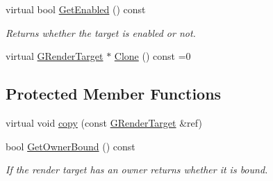 \begin{DoxyCompactItemize}
virtual bool \mbox{\hyperlink{class_geometry_engine_1_1_geometry_buffer_1_1_g_render_target_a6134efcdfa6fa9775c293a0802706cfc}{Get\+Enabled}} () const
\begin{DoxyCompactList}\small\item\em Returns whether the target is enabled or not. \end{DoxyCompactList}\item 
virtual \mbox{\hyperlink{class_geometry_engine_1_1_geometry_buffer_1_1_g_render_target}{G\+Render\+Target}} $\ast$ \mbox{\hyperlink{class_geometry_engine_1_1_geometry_buffer_1_1_g_render_target_a3b14d8929cf9d2acb6bc263c709ff019}{Clone}} () const =0
\end{DoxyCompactItemize}
\subsection*{Protected Member Functions}
\begin{DoxyCompactItemize}
\item 
virtual void \mbox{\hyperlink{class_geometry_engine_1_1_geometry_buffer_1_1_g_render_target_a84368b4a4cac9f916d36c3117e6b1224}{copy}} (const \mbox{\hyperlink{class_geometry_engine_1_1_geometry_buffer_1_1_g_render_target}{G\+Render\+Target}} \&ref)
\item 
\mbox{\label{class_geometry_engine_1_1_geometry_buffer_1_1_g_render_target_a41e7e08764775e4cfa63d9471ce70fff}} 
bool \mbox{\hyperlink{class_geometry_engine_1_1_geometry_buffer_1_1_g_render_target_a41e7e08764775e4cfa63d9471ce70fff}{Get\+Owner\+Bound}} () const
\begin{DoxyCompactList}\small\item\em If the render target has an owner returns whether it is bound. \end{DoxyCompactList}\end{DoxyCompactItemize}
